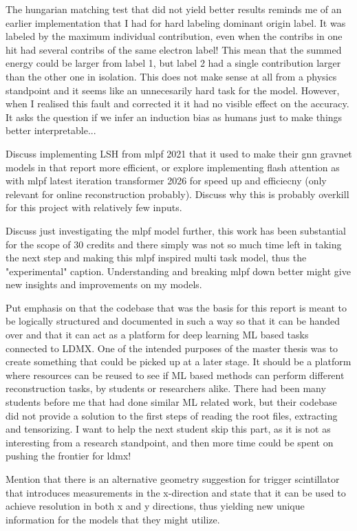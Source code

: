 The hungarian matching test that did not yield better results reminds me of an earlier implementation that I had for hard labeling dominant origin label. It was labeled by the maximum individual contribution, even when the contribs in one hit had several contribs of the same electron label! This mean that the summed energy could be larger from label 1, but label 2 had a single contribution larger than the other one in isolation. This does not make sense at all from a physics standpoint and it seems like an unnecesarily hard task for the model. However, when I realised this fault and corrected it it had no visible effect on the accuracy. It asks the question if we infer an induction bias as humans just to make things better interpretable... 

Discuss implementing LSH from mlpf 2021 that it used to make their gnn gravnet models in that report more efficient, or explore implementing flash attention as with mlpf latest iteration transformer 2026 for speed up and efficiecny (only relevant for online reconstruction probably). Discuss why this is probably overkill for this project with relatively few inputs. 

Discuss just investigating the mlpf model further, this work has been substantial for the scope of 30 credits and there simply was not so much time left in taking the next step and making this mlpf inspired multi task model, thus the "experimental" caption. Understanding and breaking mlpf down better might give new insights and improvements on my models. 

Put emphasis on that the codebase that was the basis for this report is meant to be logically structured and documented in such a way so that it can be handed over and that it can act as a platform for deep learning ML based tasks connected to LDMX. One of the intended purposes of the master thesis was to create something that could be picked up at a later stage. It should be a platform where resources can be reused to see if ML based methods can perform  different reconstruction tasks, by students or researchers alike. There had been many students before me that had done similar ML related work, but their codebase did not provide a solution to the first steps of reading the root files, extracting and tensorizing. I want to help the next student skip this part, as it is not as interesting from a research standpoint, and then more time could be spent on pushing the frontier for ldmx! 

Mention that there is an alternative geometry suggestion for trigger scintillator that introduces measurements in the x-direction and state that it can be used to achieve resolution in both x and y directions, thus yielding new unique information for the models that they might utilize.

